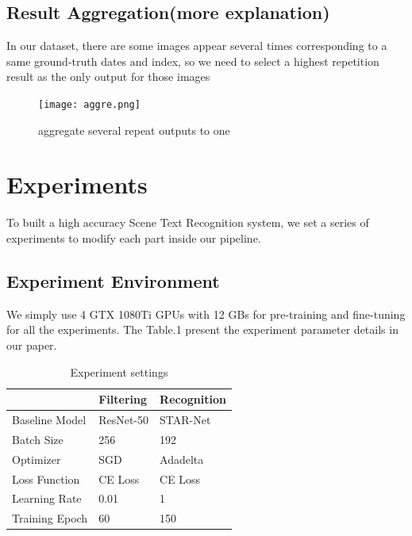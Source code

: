 \documentclass{article}
\begin{document}
\subsection{Result Aggregation(more explanation)}

In our dataset, there are some images appear several times corresponding to a same ground-truth dates and index, so we need to select a highest repetition result as the only output for those images

\begin{figure}[ht] \centering    
	\label{aggregation}     
	\texttt{[image: aggre.png]}  
   
	\caption{aggregate several repeat outputs to one}
\end{figure}

\section{Experiments}

To built a high accuracy Scene Text Recognition system, we set a series of experiments to modify each part inside our pipeline. 

\subsection{Experiment Environment}

We simply use 4 GTX 1080Ti GPUs with 12 GBs for pre-training and fine-tuning for all the experiments. 
The Table.1 present the experiment parameter details in our paper.

\begin{table}[]
\centering
\begin{tabular}{l|l|l}
               & Filtering & Recognition \\ \hline
Baseline Model & ResNet-50 & STAR-Net    \\ \hline
Batch Size     & 256       & 192         \\ \hline
Optimizer      & SGD       & Adadelta    \\ \hline
Loss Function  & CE Loss   & CE Loss     \\ \hline
Learning Rate  & 0.01      & 1           \\ \hline
Training Epoch & 60        & 150         \\ 
\end{tabular}
\caption{Experiment settings}
\label{Experiment settings}
\end{table}
\end{document}
